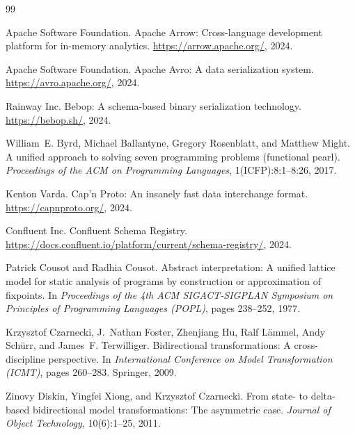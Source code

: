 \documentclass[11pt,a4paper]{article}
\theoremstyle{definition}
\theoremstyle{remark}
\begin{document}
\begin{thebibliography}{99}

Apache Software Foundation.
\newblock Apache Arrow: Cross-language development platform for in-memory
  analytics.
\newblock \url{https://arrow.apache.org/}, 2024.

Apache Software Foundation.
\newblock Apache Avro: A data serialization system.
\newblock \url{https://avro.apache.org/}, 2024.

Rainway Inc.
\newblock Bebop: A schema-based binary serialization technology.
\newblock \url{https://bebop.sh/}, 2024.

William~E. Byrd, Michael Ballantyne, Gregory Rosenblatt, and Matthew Might.
\newblock A unified approach to solving seven programming problems (functional
  pearl).
\newblock \emph{Proceedings of the ACM on Programming Languages},
  1(ICFP):8:1--8:26, 2017.

Kenton Varda.
\newblock Cap'n Proto: An insanely fast data interchange format.
\newblock \url{https://capnproto.org/}, 2024.

Confluent Inc.
\newblock Confluent Schema Registry.
\newblock \url{https://docs.confluent.io/platform/current/schema-registry/},
  2024.

Patrick Cousot and Radhia Cousot.
\newblock Abstract interpretation: A unified lattice model for static analysis
  of programs by construction or approximation of fixpoints.
\newblock In \emph{Proceedings of the 4th ACM SIGACT-SIGPLAN Symposium on
  Principles of Programming Languages (POPL)}, pages 238--252, 1977.

Krzysztof Czarnecki, J.~Nathan Foster, Zhenjiang Hu, Ralf L\"ammel,
  Andy Sch\"urr, and James~F. Terwilliger.
\newblock Bidirectional transformations: A cross-discipline perspective.
\newblock In \emph{International Conference on Model Transformation (ICMT)},
  pages 260--283. Springer, 2009.

Zinovy Diskin, Yingfei Xiong, and Krzysztof Czarnecki.
\newblock From state- to delta-based bidirectional model transformations: The
  asymmetric case.
\newblock \emph{Journal of Object Technology}, 10(6):1--25, 2011.


\end{thebibliography}
\end{document}
